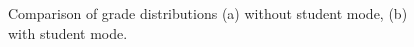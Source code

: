 \documentclass[sigconf, authordraft, capitalise]{acmart}
\begin{document}
\begin{figure}
    \centering
     \qquad
    \caption{Comparison of grade distributions (a) without student mode, (b) with student mode.}
    \label{fig-distribution-comparison}
\end{figure}
\end{document}
